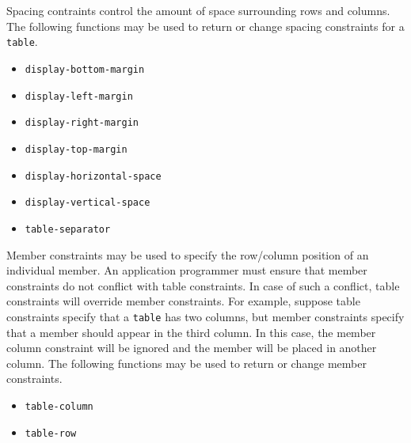 Spacing contraints control the amount of space surrounding rows and columns.
The following functions may be used to return or change spacing constraints for a {\tt
table}.

\begin{itemize}
\item {\tt display-bottom-margin}
\item {\tt display-left-margin}
\item {\tt display-right-margin}
\item {\tt display-top-margin}
\item {\tt display-horizontal-space}
\item {\tt display-vertical-space}
\item {\tt table-separator}
\end{itemize}

Member constraints may be used to specify the row/column position of an individual
member.  An application programmer must ensure that member constraints do not
conflict with table constraints.  In case of such a conflict, table constraints
will override member constraints.  For example, suppose table constraints specify
that a {\tt table} has two columns, but member constraints specify that a member
should appear in the third column.  In this case, the member column constraint
will be ignored and the member will be placed in another column.  The following
functions may be used to return or change member constraints.

\begin{itemize}
\item {\tt table-column}
\item {\tt table-row}
\end{itemize}


	 
